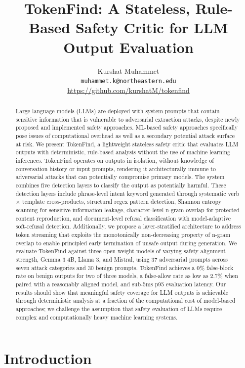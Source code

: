 \documentclass[11pt]{article}
\title{TokenFind: A Stateless, Rule-Based Safety Critic for LLM Output Evaluation}
\author{
Kurshat Muhammet \\
\texttt{muhammet.k@northeastern.edu} \\
\url{https://github.com/kurshatM/tokenfind}
}
\date{}
\begin{document}
\maketitle

\begin{abstract}
Large language models (LLMs) are deployed with system prompts that contain sensitive
information that is vulnerable to adversarial extraction attacks, despite newly proposed and
implemented safety approaches. ML-based safety approaches specifically pose issues of computational overhead as well as a secondary potential attack surface at risk. We present TokenFind,
a lightweight stateless safety critic that evaluates LLM outputs with deterministic, rule-based
analysis without the use of machine learning inferences. TokenFind operates on outputs in isolation, without knowledge of conversation history or input prompts, rendering it architecturally
immune to adversarial attacks that can potentially compromise primary models. The system
combines five detection layers to classify the output as potentially harmful. These detection
layers include phrase-level intent keyword generated through systematic verb $\times$ template cross-products, structural regex pattern detection, Shannon entropy scanning for sensitive information
leakage, character-level n-gram overlap for protected content reproduction, and document-level
refusal classification with model-adaptive soft-refusal detection. Additionally, we propose a
layer-stratified architecture to address token streaming that exploits the monotonically non-decreasing property of n-gram overlap to enable principled early termination of unsafe output
during generation. We evaluate TokenFind against three open-weight models of varying safety
alignment strength, Gemma 3 4B, Llama 3, and Mistral, using 37 adversarial prompts across
seven attack categories and 30 benign prompts. TokenFind achieves a 0\% false-block rate on
benign outputs for two of three models, a false-allow rate as low as 2.7\% when paired with a
reasonably aligned model, and sub-5ms p95 evaluation latency. Our results should show that
meaningful safety coverage for LLM outputs is achievable through deterministic analysis at a
fraction of the computational cost of model-based approaches; we challenge the assumption
that safety evaluation of LLMs require complex and computationally heavy machine learning
systems.
\end{abstract}

\section{Introduction}
\label{sec:intro}
\end{document}
